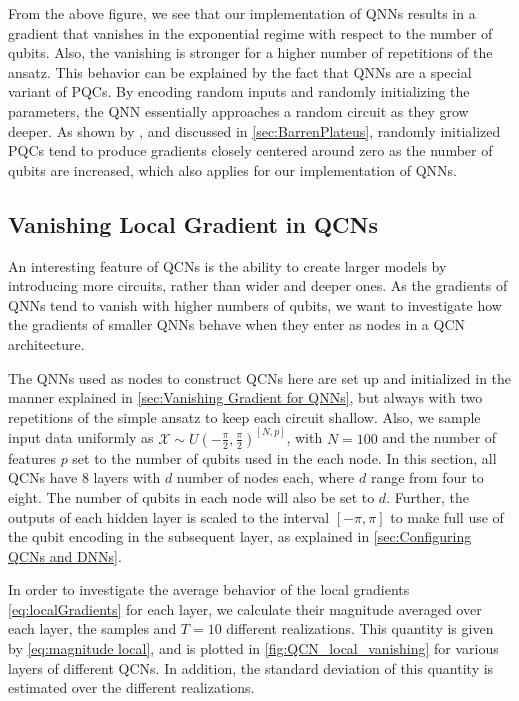 From the above figure, we see that our implementation of QNNs results in a gradient that vanishes in the exponential regime with respect to the number of qubits. Also, the vanishing is stronger for a higher number of repetitions of the ansatz. This behavior can be explained by the fact that QNNs are a special variant of PQCs. By encoding random inputs and randomly initializing the parameters, the QNN essentially approaches a random circuit as they grow deeper. As shown by \citet{McClean_2018}, and discussed in \cref{sec:BarrenPlateus}, randomly initialized PQCs tend to produce gradients closely centered around zero as the number of qubits are increased, which also applies for our implementation of QNNs.  

\subsection{Vanishing Local Gradient in QCNs}\label{sec:Vanishing Local Gradients in QCNs}

An interesting feature of QCNs is the ability to create larger models by introducing more circuits, rather than wider and deeper ones. As the gradients of QNNs tend to vanish with higher numbers of qubits, we want to investigate how the gradients of smaller QNNs behave when they enter as nodes in a QCN architecture.

The QNNs used as nodes to construct QCNs here are set up and initialized in the manner explained in \cref{sec:Vanishing Gradient for QNNs}, but always with two repetitions of the simple ansatz to keep each circuit shallow. Also, we sample input data uniformly as $\mathcal{X} \sim U(-\frac{\pi}{2}, \frac{\pi}{2})^{[N,p]}$, with $N=100$ and the number of features $p$ set to the number of qubits used in the each node. In this section, all QCNs have 8 layers with $d$ number of nodes each, where $d$ range from four to eight. The number of qubits in each node will also be set to $d$. Further, the outputs of each hidden layer is scaled to the interval $[-\pi, \pi]$ to make full use of the qubit encoding in the subsequent layer, as explained in \cref{sec:Configuring QCNs and DNNs}.

In order to investigate the average behavior of the local gradients \cref{eq:localGradients} for each layer, we calculate their magnitude averaged over each layer, the samples and $T = 10$ different realizations. This quantity is given by \cref{eq:magnitude local}, and is plotted in \cref{fig:QCN_local_vanishing} for various layers of different QCNs. In addition, the standard deviation of this quantity is estimated over the different realizations. 

